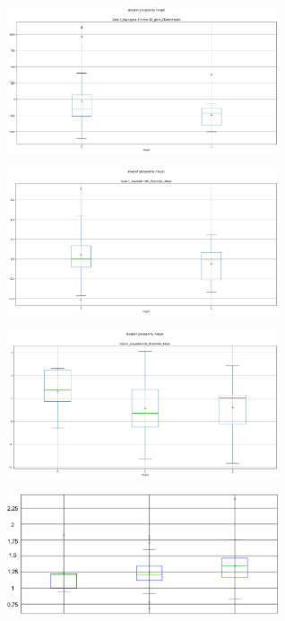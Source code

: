 \documentclass[final,1p,times,twocolumn]{elsarticle}
\begin{document}
\begin{figure}
\begin{subfigure}{}
  \centering
  \includegraphics[width=8cm]{bg1.png}
  \caption{}
  \label{fig:sfig1}
\end{subfigure}%
\begin{subfigure}{}
  \centering
  \includegraphics[width=8cm]{bg2.png}
  \caption{}
  \label{fig:sfig2}
\end{subfigure}
\begin{subfigure}{}
  \centering
  \includegraphics[width=8cm]{tg1.png}
  \caption{}
  \label{fig:sfig3}
\end{subfigure}%
\begin{subfigure}{}
  \centering
  \includegraphics[width=8cm]{tg2.png}
  \caption{}
  \label{fig:sfig4}
\end{subfigure}
\end{figure}
\end{document}
